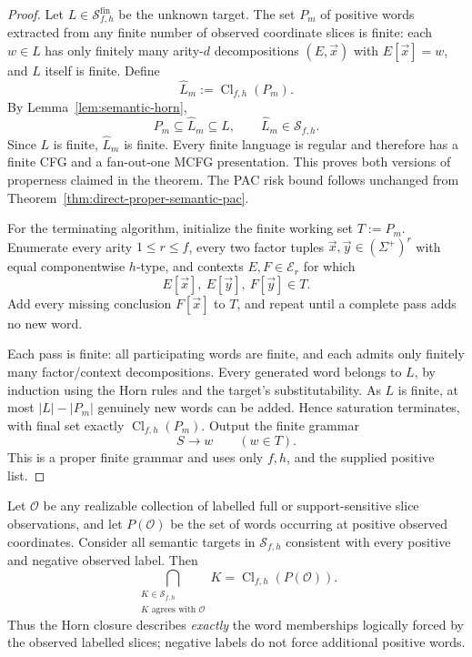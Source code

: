 \begin{proof}
Let \(L\in\mathcal S^{\mathrm{fin}}_{f,h}\)
be the unknown target.  The set \(P_m\) of
positive words extracted from any finite number
of observed coordinate slices is finite:
each \(w\in L\) has only finitely many
arity-\(d\) decompositions \((E,\vec x)\)
with \(E[\vec x]=w\), and \(L\) itself is
finite.  Define
\[
 \widehat L_m:=\operatorname{Cl}_{f,h}(P_m).
\]
By Lemma~\ref{lem:semantic-horn},
\[
 P_m\subseteq\widehat L_m\subseteq L,
 \qquad\widehat L_m\in\mathcal S_{f,h}.
\]
Since \(L\) is finite, \(\widehat L_m\) is finite.
Every finite language is regular and therefore
has a finite CFG and a fan-out-one MCFG
presentation.  This proves both versions of
properness claimed in the theorem.  The PAC
risk bound follows unchanged from
Theorem~\ref{thm:direct-proper-semantic-pac}.

For the terminating algorithm, initialize the
finite working set \(T:=P_m\).  Enumerate every
arity \(1\le r\le f\), every two factor tuples
\(\vec x,\vec y\in(\Sigma^+)^r\) with equal
componentwise \(h\)-type, and contexts
\(E,F\in\mathcal E_r\) for which
\[
 E[\vec x],\ E[\vec y],\ F[\vec y]\in T.
\]
Add every missing conclusion \(F[\vec x]\)
to \(T\), and repeat until a complete pass
adds no new word.

Each pass is finite: all participating words
are finite, and each admits only finitely
many factor/context decompositions.
Every generated word belongs to \(L\),
by induction using the Horn rules and
the target's substitutability.
As \(L\) is finite, at most \(|L|-|P_m|\)
genuinely new words can be added.  Hence
saturation terminates, with final set exactly
\(\operatorname{Cl}_{f,h}(P_m)\).
Output the finite grammar
\[
 S\longrightarrow w
 \qquad(w\in T).
\]
This is a proper finite grammar and uses
only \(f,h\), and the supplied positive list.
\end{proof}

\begin{proposition}
\label{prop:forced-positive-version-space}
Let \(\mathcal O\) be any realizable
collection of labelled full or support-sensitive
slice observations, and let \(P(\mathcal O)\)
be the set of words occurring at positive
observed coordinates.  Consider all semantic
targets in \(\mathcal S_{f,h}\) consistent
with every positive and negative observed label.
Then
\[
 \bigcap_{\substack{K\in\mathcal S_{f,h}\\
                   K\text{ agrees with }\mathcal O}}
  K
 =\operatorname{Cl}_{f,h}(P(\mathcal O)).
\]
Thus the Horn closure describes \emph{exactly}
the word memberships logically forced by the
observed labelled slices; negative labels
do not force additional positive words.
\end{proposition}

